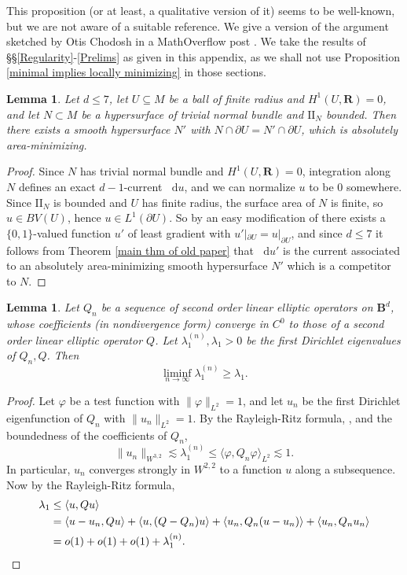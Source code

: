 \documentclass[reqno,11pt]{amsart}
\newcommand{\RR}{\mathbf{R}}
\newcommand{\Ball}{\mathbf{B}}
\newcommand*\dif{\mathop{}\!\mathrm{d}}
\newcommand{\Two}{\mathrm{I\!I}}
\newtheorem{lemma}[theorem]{Lemma}
\theoremstyle{definition}
\numberwithin{equation}{section}
\begin{document}
This proposition (or at least, a qualitative version of it) seems to be well-known, but we are not aware of a suitable reference.
We give a version of the argument sketched by Otis Chodosh in a MathOverflow post \cite{MathOverflowMinimalLocal}.
We take the results of \S\S\ref{Regularity}-\ref{Prelims} as given in this appendix, as we shall not use Proposition \ref{minimal implies locally minimizing} in those sections.

\begin{lemma}\label{existence of absolute minimizers}
Let $d \leq 7$, let $U \subseteq M$ be a ball of finite radius and $H^1(U, \RR) = 0$, and let $N \subset M$ be a hypersurface of trivial normal bundle and $\Two_N$ bounded.
Then there exists a smooth hypersurface $N'$ with $N \cap \partial U = N' \cap \partial U$, which is absolutely area-minimizing.
\end{lemma}
\begin{proof}
Since $N$ has trivial normal bundle and $H^1(U, \RR) = 0$, integration along $N$ defines an exact $d - 1$-current $\dif u$, and we can normalize $u$ to be $0$ somewhere.
Since $\Two_N$ is bounded and $U$ has finite radius, the surface area of $N$ is finite, so $u \in BV(U)$, hence $u \in L^1(\partial U)$.
So by an easy modification of \cite[Theorem 1.20]{Giusti77} there exists a $\{0, 1\}$-valued function $u'$ of least gradient with $u'|_{\partial U} = u|_{\partial U}$, and since $d \leq 7$ it follows from Theorem \ref{main thm of old paper} that $\dif u'$ is the current associated to an absolutely area-minimizing smooth hypersurface $N'$ which is a competitor to $N$.
\end{proof}

\begin{lemma}
Let $Q_n$ be a sequence of second order linear elliptic operators on $\Ball^d$, whose coefficients (in nondivergence form) converge in $C^0$ to those of a second order linear elliptic operator $Q$.
Let $\lambda_1^{(n)}, \lambda_1 > 0$ be the first Dirichlet eigenvalues of $Q_n, Q$.
Then 
\begin{equation}\label{spectral gap}
\liminf_{n \to \infty} \lambda_1^{(n)} \geq \lambda_1.
\end{equation}
\end{lemma}
\begin{proof}
Let $\varphi$ be a test function with $\|\varphi\|_{L^2} = 1$, and let $u_n$ be the first Dirichlet eigenfunction of $Q_n$ with $\|u_n\|_{L^2} = 1$.
By the Rayleigh-Ritz formula, \cite[Theorem 8.13]{gilbarg2015elliptic}, and the boundedness of the coefficients of $Q_n$,
$$\|u_n\|_{W^{3, 2}} \lesssim \lambda_1^{(n)} \leq \langle \varphi, Q_n \varphi\rangle_{L^2} \lesssim 1.$$
In particular, $u_n$ converges strongly in $W^{2, 2}$ to a function $u$ along a subsequence.
Now by the Rayleigh-Ritz formula,
\begin{align*}
\lambda_1 &\leq \langle u, Qu\rangle \\
&= \langle u - u_n, Qu\rangle + \langle u, (Q - Q_n) u\rangle + \langle u_n, Q_n(u - u_n)\rangle + \langle u_n, Q_n u_n\rangle \\
&= o(1) + o(1) + o(1) + \lambda_1^{(n)}. \qedhere
\end{align*}
\end{proof}
\end{document}
